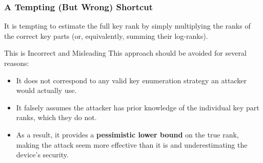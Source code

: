 \begin{frame}
    \frametitle{A Tempting (But Wrong) Shortcut}
    
    It is tempting to estimate the full key rank by simply multiplying the ranks of the correct key parts (or, equivalently, summing their log-ranks).
    
    \begin{alertblock}{This is Incorrect and Misleading}
        This approach should be avoided for several reasons:
        \begin{itemize}
            \item It does not correspond to any valid key enumeration strategy an attacker would actually use.
            \item It falsely assumes the attacker has prior knowledge of the individual key part ranks, which they do not.
            \item As a result, it provides a \textbf{pessimistic lower bound} on the true rank, making the attack seem more effective than it is and underestimating the device's security.
        \end{itemize}
    \end{alertblock}
\end{frame}


